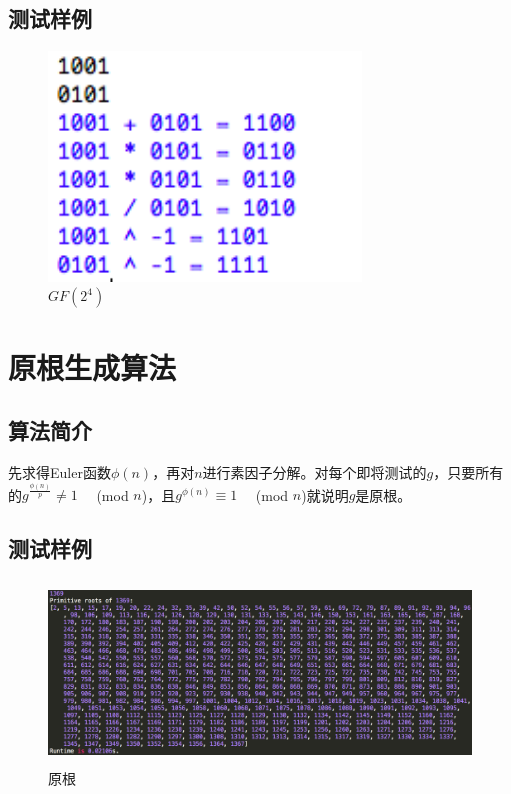 \documentclass[11pt]{ctexart}
\begin{document}
\subsection{测试样例}
\begin{figure}[htbp]
\centering
\includegraphics[height=6.1cm,width=8.3cm]{gf16.png}
\caption{$GF(2^4)$}
\label{img_gf16}
\end{figure}







\section{原根生成算法}%
\subsection{算法简介}
 先求得Euler函数$\phi(n)$，再对$n$进行素因子分解。对每个即将测试的$g$，只要所有的$g^{\frac{\phi(n)}{p}}\neq 1 \quad$ (mod $n$)，且$g^{\phi(n)} \equiv 1 \quad$ (mod $n$)就说明$g$是原根。
\subsection{测试样例}
\begin{figure}[htbp]
\centering
\includegraphics[height=4.84cm,width=12.47cm]{root.png}
\caption{原根}
\label{img_roots}
\end{figure}
\end{document}
